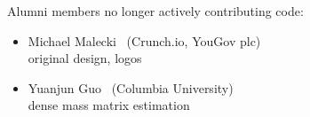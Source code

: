 \vspace*{12pt}

\noindent
Alumni members no longer actively contributing code:
\begin{itemize}
\item Michael Malecki \ (Crunch.io, YouGov plc)
\\ {\footnotesize original design, logos}
\item Yuanjun Guo \ (Columbia University)
\\ {\footnotesize dense mass matrix estimation}
\end{itemize}